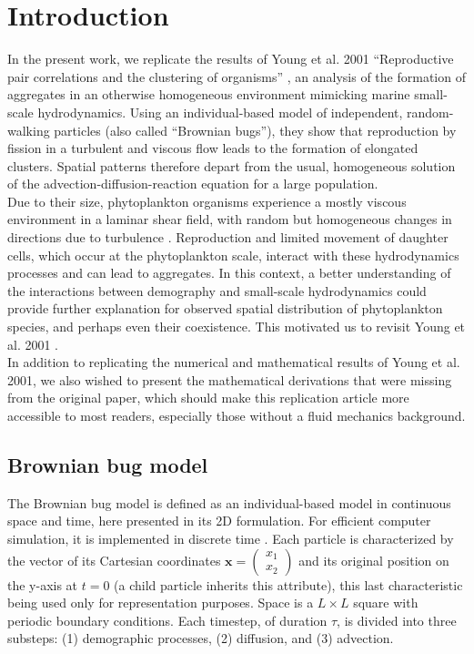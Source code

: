 
\section*{Introduction}

In the present work, we replicate the results of Young et al. 2001 ``Reproductive pair correlations and the clustering of organisms'' \cite{young_reproductive_2001}, an analysis of the formation of aggregates in an otherwise homogeneous environment mimicking marine small-scale hydrodynamics. Using an individual-based model of independent, random-walking particles (also called ``Brownian bugs''), they show that reproduction by fission in a turbulent \cite{tennekes1972first} and viscous flow leads to the formation of elongated clusters. Spatial patterns therefore depart from the usual, homogeneous solution of the advection-diffusion-reaction equation for a large population. \\

Due to their size, phytoplankton organisms experience a mostly viscous environment in a laminar shear field, with random but homogeneous changes in directions due to turbulence  \citep{dusenbery2009living, peters_effects_2000}. Reproduction and limited movement of daughter cells, which occur at the phytoplankton scale, interact with these hydrodynamics processes and can lead to aggregates.  In this context, a better understanding of the interactions between demography and small-scale hydrodynamics could provide further explanation for observed spatial distribution of phytoplankton species, and perhaps even their coexistence. This motivated us to revisit Young et al. 2001 \cite{young_reproductive_2001}. \\

In addition to replicating the numerical and mathematical results of Young et al. 2001, we also wished to present the mathematical derivations that were missing from the original paper, which should make this replication article more accessible to most readers, especially those without a fluid mechanics background. 

\subsection*{Brownian bug model}
The Brownian bug model is defined as an individual-based model in continuous space and time, here presented in its 2D formulation. For efficient computer simulation, it is implemented in discrete time \cite{young_reproductive_2001}. Each particle is characterized by the vector of its Cartesian coordinates $\boldsymbol{x}=\begin{pmatrix} 
      x_1\\ 
      x_2 
\end{pmatrix}$ and its original position on the y-axis at $t=0$ (a child particle inherits this attribute), this last characteristic being used only for representation purposes. Space is a $L\times L$ square with periodic boundary conditions. Each timestep, of duration $\tau$, is divided into three substeps: (1) demographic processes, (2) diffusion, and (3) advection. \\

